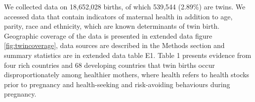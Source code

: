 \documentclass{nature}
\begin{document}
\begin{linenumbers}


We collected data on 18,652,028 births, of which 539,544 (2.89\%) are twins. We accessed data that contain indicators of maternal health in addition to age, parity, race and ethnicity, which are known determinants of twin birth\cite{Bulmer1970}. Geographic coverage of the data is presented in extended data figure \ref{fig:twincoverage}, data sources are described in the Methods section and summary statistics are in extended data table E1. Table 1 presents evidence from four rich countries and 68 developing countries that twin births occur disproportionately among healthier mothers, where health refers to health stocks prior to pregnancy and health-seeking and risk-avoiding behaviours during pregnancy. %




\end{linenumbers}
\end{document}
